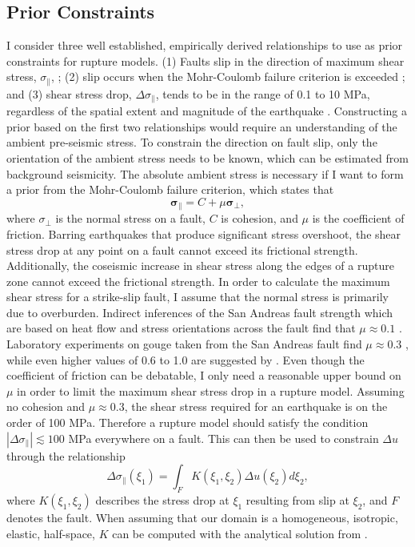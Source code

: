 \documentclass[12pt]{article}
\begin{document}
\subsection*{Prior Constraints}
I consider three well established, empirically derived relationships to use as prior constraints for rupture models. (1) Faults slip in the direction of maximum shear stress, $\sigma_\parallel$, \citep{Wallace1951}; (2) slip occurs when the Mohr-Coulomb failure criterion is exceeded \citep{Byerlee1978}; and (3) shear stress drop, $\Delta \sigma_\parallel$, tends to be in the range of 0.1 to 10 MPa, regardless of the spatial extent and magnitude of the earthquake \citep{Kanamori1975,Shearer2006}.  Constructing a prior based on the first two relationships would require an understanding of the ambient pre-seismic stress.  To constrain the direction on fault slip, only the orientation of the ambient stress needs to be known, which can be estimated from background seismicity.  The absolute ambient stress is necessary if I want to form a prior from the Mohr-Coulomb failure criterion, which states that
\begin{equation}\label{eq:MohrCoulomb}
  \mathbf{\sigma_\parallel} = C + \mu \mathbf{\sigma_\bot},
\end{equation}
where $\sigma_\bot$ is the normal stress on a fault, $C$ is cohesion, and $\mu$ is the coefficient of friction.  Barring earthquakes that produce significant stress overshoot, the shear stress drop at any point on a fault cannot exceed its frictional strength.  Additionally, the coseismic increase in shear stress along the edges of a rupture zone cannot exceed the frictional strength. In order to calculate the maximum shear stress for a strike-slip fault, I assume that the normal stress is primarily due to overburden.  Indirect inferences of the San Andreas fault strength which are based on heat flow and stress orientations across the fault find that $\mu\approx0.1$ \citep{Brune1969,Zoback1987}.  Laboratory experiments on gouge taken from the San Andreas fault find $\mu\approx0.3$ \citep{Carpenter2011}, while even higher values of 0.6 to 1.0 are suggested by \citet{Byerlee1978}. Even though the coefficient of friction can be debatable, I only need a reasonable upper bound on $\mu$ in order to limit the maximum shear stress drop in a rupture model.  Assuming no cohesion and $\mu\approx0.3$, the shear stress required for an earthquake is on the order of 100 MPa.  Therefore a rupture model should satisfy the condition $|\Delta\sigma_\parallel|\lesssim 100$ MPa everywhere on a fault.  This can then be used to constrain $\Delta u$ through the relationship
\begin{equation}\label{eq:StressSlip}
  \Delta \sigma_\parallel (\xi_1) = \int_F K(\xi_1,\xi_2) \Delta u(\xi_2) d\xi_2,
\end{equation}
where $K(\xi_1,\xi_2)$ describes the stress drop at $\xi_1$ resulting from slip at $\xi_2$, and $F$ denotes the fault.  When assuming that our domain is a homogeneous, isotropic, elastic, half-space, $K$ can be computed with the analytical solution from \citet{Okada1992}.  
\end{document}
